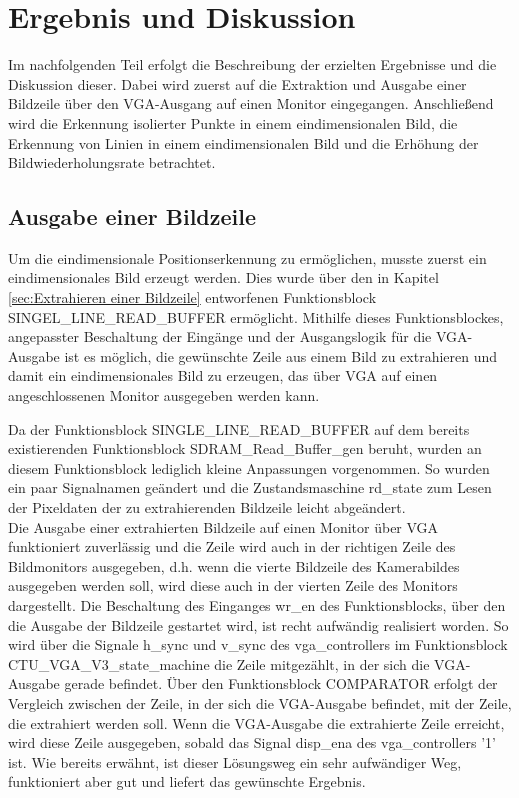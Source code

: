 \documentclass[ngerman,12pt]{article} %
\begin{document}
{%
\section{Ergebnis und Diskussion}
\label{sec:Ergebnis und Diskussion}
Im nachfolgenden Teil erfolgt die Beschreibung der erzielten Ergebnisse und die Diskussion dieser. Dabei wird zuerst auf die Extraktion und Ausgabe einer Bildzeile über den VGA-Ausgang auf einen Monitor eingegangen. Anschließend wird die Erkennung isolierter Punkte in einem eindimensionalen Bild, die Erkennung von Linien in einem eindimensionalen Bild und die Erhöhung der Bildwiederholungsrate betrachtet.



\subsection{Ausgabe einer Bildzeile}
\label{sec:Ausgabe einer Bildzeile}
Um die eindimensionale Positionserkennung zu ermöglichen, musste zuerst ein eindimensionales Bild erzeugt werden. Dies wurde über den in Kapitel \ref{sec:Extrahieren einer Bildzeile} entworfenen Funktionsblock SINGEL\_LINE\_READ\_BUFFER ermöglicht. Mithilfe dieses Funktionsblockes, angepasster Beschaltung der Eingänge und der Ausgangslogik für die VGA-Ausgabe ist es möglich, die gewünschte Zeile aus einem Bild zu extrahieren und damit ein eindimensionales Bild zu erzeugen, das über VGA auf einen angeschlossenen Monitor ausgegeben werden kann.\newline

Da der Funktionsblock SINGLE\_LINE\_READ\_BUFFER auf dem bereits existierenden Funktionsblock SDRAM\_Read\_Buffer\_gen beruht, wurden an diesem Funktionsblock lediglich kleine Anpassungen vorgenommen. So wurden ein paar Signalnamen geändert und die Zustandsmaschine rd\_state zum Lesen der Pixeldaten der zu extrahierenden Bildzeile leicht abgeändert.\\
Die Ausgabe einer extrahierten Bildzeile auf einen Monitor über VGA funktioniert zuverlässig und die Zeile wird auch in der richtigen Zeile des Bildmonitors ausgegeben, d.h. wenn die vierte Bildzeile des Kamerabildes ausgegeben werden soll, wird diese auch in der vierten Zeile des Monitors dargestellt. Die Beschaltung des Einganges wr\_en des Funktionsblocks, über den die Ausgabe der Bildzeile gestartet wird, ist recht aufwändig realisiert worden. So wird über die Signale h\_sync und v\_sync des vga\_controllers im Funktionsblock CTU\_VGA\_V3\_state\_machine die Zeile mitgezählt, in der sich die VGA-Ausgabe gerade befindet. Über den Funktionsblock COMPARATOR erfolgt der Vergleich zwischen der Zeile, in der sich die VGA-Ausgabe befindet, mit der Zeile, die extrahiert werden soll. Wenn die VGA-Ausgabe die extrahierte Zeile erreicht, wird diese Zeile ausgegeben, sobald das Signal disp\_ena des vga\_controllers '1' ist. Wie bereits erwähnt, ist dieser Lösungsweg ein sehr aufwändiger Weg, funktioniert aber gut und liefert das gewünschte Ergebnis.



}
\end{document}
